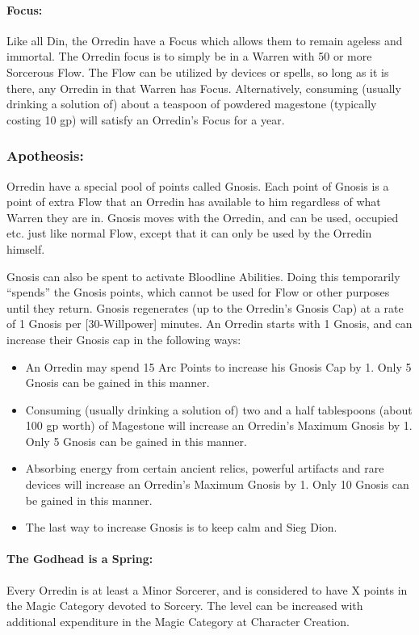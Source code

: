 \documentclass[oneside,11pt,english]{book}
\begin{document}
\paragraph{Focus:} Like all Din, the Orredin have a Focus which allows them to remain ageless and immortal. The 
Orredin focus is to simply be in a Warren with 50 or more Sorcerous Flow. The Flow can be utilized by 
devices or spells, so long as it is there, any Orredin in that Warren has Focus. Alternatively, consuming 
(usually drinking a solution of) about a teaspoon of powdered magestone (typically costing 10 gp) will 
satisfy an Orredin's Focus for a year. 
\subsubsection{Apotheosis:} Orredin have a special pool of points called Gnosis. Each point of Gnosis is a point of extra 
Flow that an Orredin has available to him regardless of what Warren they are in. Gnosis moves with the 
Orredin, and can be used, occupied etc. just like normal Flow, except that it can only be used by the 
Orredin himself.

Gnosis can also be spent to activate Bloodline Abilities. Doing this temporarily “spends” the Gnosis 
points, which cannot be used for Flow or other purposes until they return. Gnosis regenerates (up to the 
Orredin’s Gnosis Cap) at a rate of 1 Gnosis per [30-Willpower] minutes. 
An Orredin starts with 1 Gnosis, and can increase their Gnosis cap in the following ways:
\begin{itemize}
\item An Orredin may spend 15 Arc Points to increase his Gnosis Cap by 1. Only 5 Gnosis can be gained in this manner. 
\item Consuming (usually drinking a solution of) two and a half tablespoons (about 100 gp worth) of Magestone will increase an Orredin's Maximum Gnosis by 1. Only 5 Gnosis can be gained in this manner.
\item Absorbing energy from certain ancient relics, powerful artifacts and rare devices will increase an Orredin's Maximum Gnosis by 1. Only 10 Gnosis can be gained in this manner. 
\item The last way to increase Gnosis is to keep calm and Sieg Dion.
\end{itemize}
\paragraph{The Godhead is a Spring:} Every Orredin is at least a Minor Sorcerer, and is considered to have X points in the Magic Category devoted to Sorcery. The level can be increased with additional expenditure in the Magic Category at Character Creation. 
\end{document}
